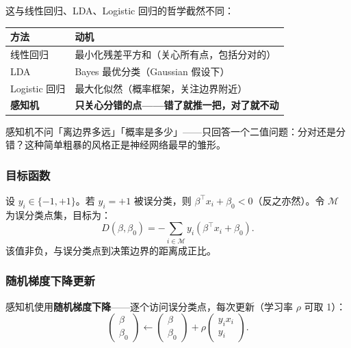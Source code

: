 这与线性回归、LDA、Logistic 回归的哲学截然不同：

\begin{center}
\begin{tabular}{ll}
\toprule
方法 & 动机 \\
\midrule
线性回归 & 最小化残差平方和（关心所有点，包括分对的） \\
LDA & Bayes 最优分类（Gaussian 假设下） \\
Logistic 回归 & 最大化似然（概率框架，关注边界附近） \\
\textbf{感知机} & \textbf{只关心分错的点——错了就推一把，对了就不动} \\
\bottomrule
\end{tabular}
\end{center}

感知机不问「离边界多远」「概率是多少」——只回答一个二值问题：分对还是分错？这种简单粗暴的风格正是神经网络最早的雏形。

\subsubsection{目标函数}

设 $y_i \in \{-1, +1\}$。若 $y_i = +1$ 被误分类，则 $\beta^\top x_i + \beta_0 < 0$（反之亦然）。令 $\mathcal{M}$ 为误分类点集，目标为：
\begin{equation}\label{eq:perceptron_objective}
    D(\beta, \beta_0) = -\sum_{i \in \mathcal{M}} y_i (\beta^\top x_i + \beta_0).
\end{equation}
该值非负，与误分类点到决策边界的距离成正比。

\subsubsection{随机梯度下降更新}

感知机使用\textbf{随机梯度下降}——逐个访问误分类点，每次更新（学习率 $\rho$ 可取 1）：
\begin{equation}\label{eq:perceptron_update}
    \begin{pmatrix} \beta \\ \beta_0 \end{pmatrix}
    \leftarrow \begin{pmatrix} \beta \\ \beta_0 \end{pmatrix}
    + \rho \begin{pmatrix} y_i x_i \\ y_i \end{pmatrix}.
\end{equation}

